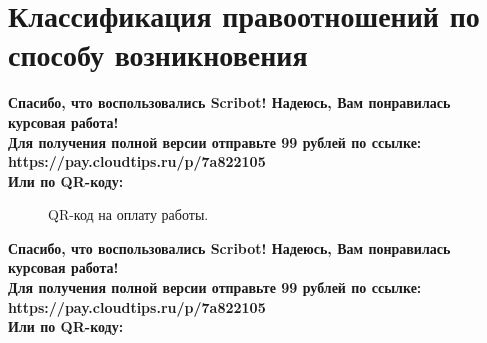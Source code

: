 \documentclass{article}
\begin{document}
\section{Классификация правоотношений по способу возникновения}
\begin{center}
    \textbf{
        Спасибо, что воспользовались Scribot! Надеюсь, Вам понравилась курсовая работа!\\
        Для получения полной версии отправьте 99 рублей по ссылке:\\
        https://pay.cloudtips.ru/p/7a822105\\
        Или по QR-коду:\\
    }
\end{center}
\begin{figure}[h]
    \caption{QR-код на оплату работы.}
    \label{ris:image}
\end{figure}
\newpage
\begin{center}
    \textbf{
        Спасибо, что воспользовались Scribot! Надеюсь, Вам понравилась курсовая работа!\\
        Для получения полной версии отправьте 99 рублей по ссылке:\\
        https://pay.cloudtips.ru/p/7a822105\\
        Или по QR-коду:\\
    }
\end{center}
\end{document}
